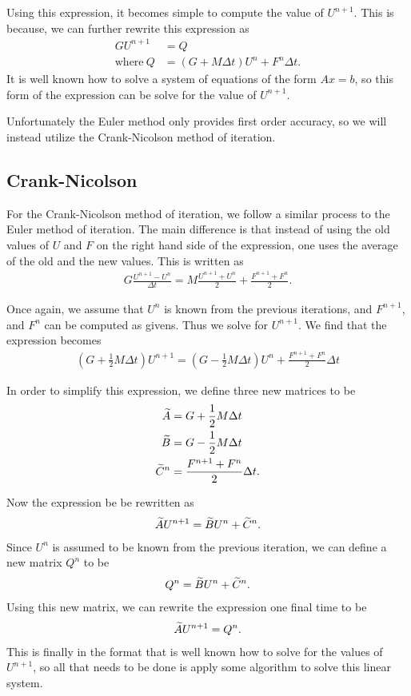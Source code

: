 \documentclass[../fem.tex]{subfiles}
\begin{document}
Using this expression, it becomes simple to compute the value of $U^{n+1}$.
This is because, we can further rewrite this expression as
\begin{align*}
  GU^{n+1}&=Q\\\text{where}\ Q&=\left(G+M\Delta t\right)U^n+F^n\Delta t.
\end{align*}
It is well known how to solve a system of equations of the form $Ax=b$, so this
form of the expression can be solve for the value of $U^{n+1}$.

Unfortunately the Euler method only provides first order accuracy, so we will
instead utilize the Crank-Nicolson method of iteration.

\subsection{Crank-Nicolson}%
\label{sub:crank_nicolson}

For the Crank-Nicolson method of iteration, we follow a similar process to the
Euler method of iteration. The main difference is that instead of using the old
values of $U$ and $F$ on the right hand side of the expression, one uses the
average of the old and the new values. This is written as
\begin{align*}
  G\frac{U^{n+1}-U^n}{\Delta t}=M\frac{U^{n+1}+U^n}{2}+\frac{F^{n+1}+F^n}{2}.
\end{align*}

Once again, we assume that $U^n$ is known from the previous iterations, and
$F^{n+1}$, and $F^n$ can be computed as givens. Thus we solve for $U^{n+1}$. We
find that the expression becomes
\begin{align*}
  \left(G+\frac{1}{2}M\Delta t\right)U^{n+1}=\left(G-\frac{1}{2}M\Delta
  t\right)U^n+\frac{F^{n+1}+F^n}{2}\Delta t
\end{align*}

In order to simplify this expression, we define three new matrices to be
\begin{align*}
  \widetilde{A}&=G+\frac{1}{2}M\Delta t\\
  \widetilde{B}&=G-\frac{1}{2}M\Delta t\\
  \widetilde{C}^n&=\frac{F^{n+1}+F^n}{2}\Delta t.
\end{align*}

Now the expression be be rewritten as
\begin{align*}
  \widetilde{A}U^{n+1}=\widetilde{B}U^n+\widetilde{C}^n.
\end{align*}
Since $U^n$ is assumed to be known from the previous iteration, we can define a
new matrix $Q^n$ to be
\begin{align*}
  Q^n=\widetilde{B}U^n+\widetilde{C}^n.
\end{align*}
Using this new matrix, we can rewrite the expression one final time to be
\begin{align*}
  \widetilde{A}U^{n+1}=Q^n.
\end{align*}
This is finally in the format that is well known how to solve for the values of
$U^{n+1}$, so all that needs to be done is apply some algorithm to solve this
linear system.
\end{document}
